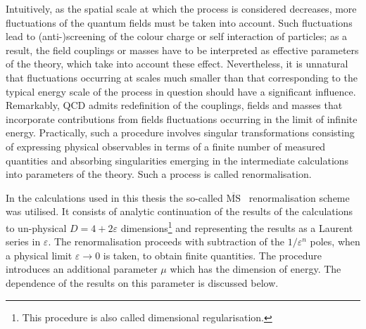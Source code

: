 Intuitively, as the spatial scale at which the process is considered decreases,  more fluctuations of the quantum fields must be taken into account. Such fluctuations lead to (anti-)screening of the colour charge or self interaction of particles; as a result, the field couplings or masses have to be interpreted as effective parameters of the theory, which take into account these effect. Nevertheless, it is unnatural that fluctuations occurring at scales much smaller than that corresponding to the typical energy scale of the process in question should have a significant influence. Remarkably, QCD admits redefinition of the couplings, fields and masses that incorporate contributions from fields fluctuations occurring in the limit of infinite energy. Practically, such a procedure involves singular transformations consisting of expressing physical observables in terms of a finite number of measured quantities and absorbing singularities emerging in the intermediate calculations into parameters of the theory. Such a process is called renormalisation. 

In the calculations used in this thesis the so-called $\overline{\mathrm{MS}}$~\cite{Bardeen:1978yd} renormalisation scheme was utilised. It consists of analytic continuation of the results of the calculations to un-physical $D=4+2\varepsilon$ dimensions\footnote{This procedure is also called dimensional regularisation.} and representing the results as a Laurent series in $\varepsilon$. The renormalisation proceeds with subtraction of the $1/\varepsilon^n$ poles, when a physical limit $\varepsilon \rightarrow 0$ is taken, to obtain finite quantities. The procedure introduces an additional parameter $\mu$ which has the dimension of energy. The dependence of the results on this parameter is discussed below.
